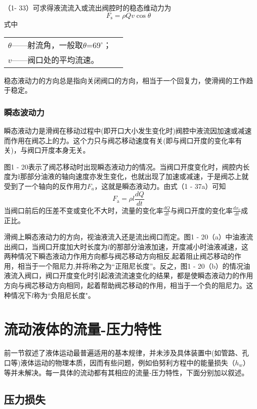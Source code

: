 （1- 33）可求得液流流入或流出阀腔时的稳态维动力为
\begin{equation}
F_\text{s}=\rho Qv\cos \theta
\end{equation}
\noindent 式中\ 
\begin{tabular}[t]{ll}
$\theta$——射流角，一般取$\theta$=$69^{\circ}$；\\
$v$——阀口处的平均流速。
\end{tabular}

稳态液动力的方向总是指向关闭阀口的方向，相当于一个回复力，使滑阀的工作趋于稳定。

\subsubsection*{瞬态波动力}

    瞬态液动力是滑阀在移动过程中(即开口大小发生变化时)阀腔中液流因加速或减速而作用在阀芯上的力。这个力只与阀芯移动速度有关(即与阀口开度的变化率有关)，与阀口开度本身无关。

    图1 - 20表示了阀芯移动时出现瞬态液动力的情况。当阀口开度变化时，阀腔内长度为\l 那部分油液的轴向速度亦发生变化，也就出现了加速或减速，于是阀芯上就受到了一个轴向的反作用力$F_{a}$，这就是瞬态液动力。由式（1 - 37a）可知
\begin{equation*}
F_\text{a}=\rho l \frac{dQ}{dt}
\end{equation*}
当阀口前后的压差不变或变化不大时，流量的变化率$\frac{dQ}{dt}$与阀口开度的变化率$\frac{dx_{v}}{dt}$成正比。

    滑阀上瞬态液动力的方向，视油液流入还是流出阀口而定。图1 - 20（a）中油液流出阀口，当阀口开度加大时长度为$l$的那部分油液加速，开度减小时油液减速，这两种情况下瞬态液动力作用方向都与阀芯移动方向相反,起着阻止阀芯移动的作用，相当于一个阻尼力,并将$l$称之为“正阻尼长度”。反之，图1 - 20（b）的情况油液流入阀口，阀口开度变化时引起液流流速变化的结果，都是使瞬态液动力的作用方向与阀芯移动方向相同，起着帮助阀芯移动的作用，相当于一个负的阻尼力。这种情况下$l$称为“负阻尼长度"。


\section{流动液体的流量-压力特性}

前一节叙述了液体运动最普遍适用的基本规律，并未涉及具体装置中(如管路、孔口等)液体运动的物理本质，因而有些问题，例如伯努利方程中的能量损失（$h_{w}$）等并未解决。每一具体的流动都有其相应的流量-压力特性，下面分别加以叙述。

\subsection*{压力损失}

